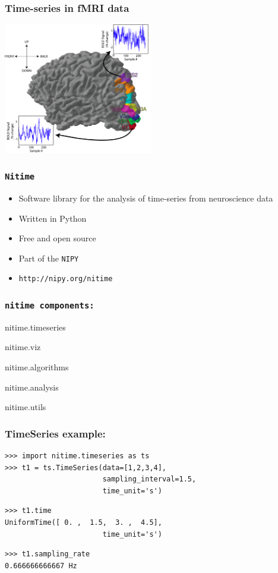 \documentclass{beamer}
\begin{document}
\begin{frame}
\frametitle{Time-series in fMRI data}
\includegraphics[height=5.7cm]{figures/brain_w_tseries}
\end{frame}

\begin{frame}
\frametitle{\tt{Nitime}}
\begin{itemize}
\pause
\item
Software library for the analysis of time-series from neuroscience data
\pause
\item
Written in Python
\pause
\item 
Free and open source
\pause
\item
Part of the \tt{NIPY} 
\pause
\item
\tt{http://nipy.org/nitime}
\end{itemize}
\end{frame}

\begin{frame}
\frametitle{\tt{nitime} components:}
\begin{itemize}
\begin{tt}
\pause
\item
nitime.timeseries
\pause
\item
nitime.viz
\pause
\item
nitime.algorithms
\pause
\item
nitime.analysis
\pause 
\item
nitime.utils
\end{tt}
\end{itemize}
\end{frame}

\begin{frame}[fragile]
\frametitle{TimeSeries example:}
\pause
\begin{lstlisting}
>>> import nitime.timeseries as ts 
>>> t1 = ts.TimeSeries(data=[1,2,3,4],
                       sampling_interval=1.5,
                       time_unit='s')
\end{lstlisting}

\pause
\begin{lstlisting}
>>> t1.time
UniformTime([ 0. ,  1.5,  3. ,  4.5], 
                       time_unit='s')
\end{lstlisting}

\pause
\begin{lstlisting}
>>> t1.sampling_rate
0.666666666667 Hz
\end{lstlisting}

\end{frame}
\end{document}
